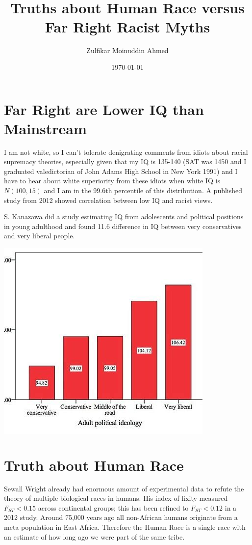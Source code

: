 \documentclass{amsart}
\title{Truths about Human Race versus Far Right Racist Myths}
\author{Zulfikar Moinuddin Ahmed}
\date{\today}
\begin{document}
\maketitle

\section{Far Right are Lower IQ than Mainstream}

I am not white, so I can't tolerate denigrating comments from idiots about racial supremacy theories, especially given that my IQ is 135-140 (SAT was 1450 and I graduated valedictorian of John Adams High School in New York 1991) and I have to hear about white superiority from these idiots when white IQ is $N(100,15)$ and I am in the 99.6th percentile of this distribution.  A published study \cite{HB} from 2012 showed correlation between low IQ and racist views.

S. Kanazawa did a study estimating IQ from adolescents and political positions in young adulthood and found 11.6 difference in IQ between very conservatives and very liberal people.  

\includegraphics[scale=0.8]{kanazawa.jpeg}

\section{Truth about Human Race}

Sewall Wright already had enormous amount of experimental data to refute the theory of multiple biological races in humans.  His index of fixity measured $F_{ST} < 0.15$ across continental groups; this has been refined to $F_{ST} < 0.12$ in a 2012 study.  Around 75,000 years ago all non-African humans originate from a meta population in East Africa.  Therefore the Human Race is a single race with an estimate of how long ago we were part of the same tribe.  
\end{document}
